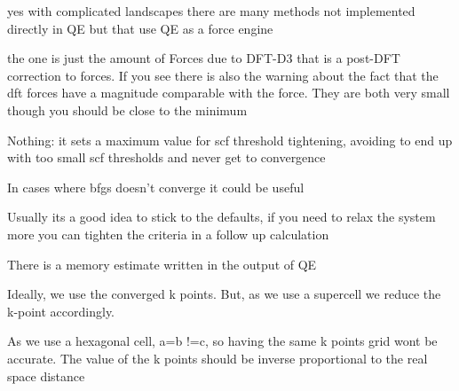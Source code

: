     yes with complicated landscapes there are many methods not implemented directly in QE but that use QE as a force engine


    the one is just the amount of Forces due to DFT-D3 that is a post-DFT correction to forces. If you see there is also the warning about the fact that the dft forces have a magnitude comparable with the force. They are both very small though you should be close to the minimum


    Nothing: it sets a maximum value for scf threshold tightening, avoiding to end up with too small scf thresholds and never get to convergence


    In cases where bfgs doesn't converge it could be useful


    Usually its a good idea to stick to the defaults, if you need to relax the system more you can tighten the criteria in a follow up calculation


    There is a memory estimate written in the output of QE


    Ideally, we use the converged k points. But, as we use a supercell we reduce the k-point accordingly.


    As we use a hexagonal cell, a=b !=c, so having the same k points grid wont be accurate. The value of the k points should be inverse  proportional to the real space distance

